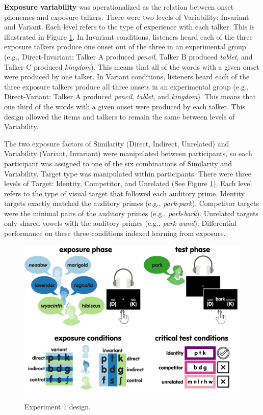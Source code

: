 \documentclass[
  12pt,
  twoside]{article}
\begin{document}
\textbf{Exposure variability} was operationalized as the relation between onset phonemes and exposure talkers.
There were two levels of Variability: Invariant and Variant.
Each level refers to the type of experience with each talker.
This is illustrated in Figure \ref{fig:exp1-fig}.
In Invariant conditions, listeners heard each of the three exposure talkers produce one onset out of the three in an experimental group (e.g., Direct-Invariant: Talker A produced \emph{pencil}, Talker B produced \emph{tablet}, and Talker C produced \emph{kingdom}).
This means that all of the words with a given onset were produced by one talker.
In Variant conditions, listeners heard each of the three exposure talkers produce all three onsets in an experimental group (e.g., Direct-Variant: Talker A produced \emph{pencil}, \emph{tablet}, and \emph{kingdom}).
This means that one third of the words with a given onset were produced by each talker.
This design allowed the items and talkers to remain the same between levels of Variability.

The two exposure factors of Similarity (Direct, Indirect, Unrelated) and Variability (Variant, Invariant) were manipulated between participants, so each participant was assigned to one of the six combinations of Similarity and Variability.
Target type was manipulated within participants.
There were three levels of Target: Identity, Competitor, and Unrelated (See Figure \ref{fig:exp1-fig}).
Each level refers to the type of visual target that followed each auditory prime.
Identity targets exactly matched the auditory primes (e.g., \emph{park}-\emph{park}).
Competitor targets were the minimal pairs of the auditory primes (e.g., \emph{park}-\emph{bark}).
Unrelated targets only shared vowels with the auditory primes (e.g., \emph{park}-\emph{wand}).
Differential performance on these three conditions indexed learning from exposure.

\begin{figure}[H]

{\centering \includegraphics[width=\textwidth]{figures/diss_1} 

}

\caption{Experiment 1 design.}\label{fig:exp1-fig}
\end{figure}
\end{document}

